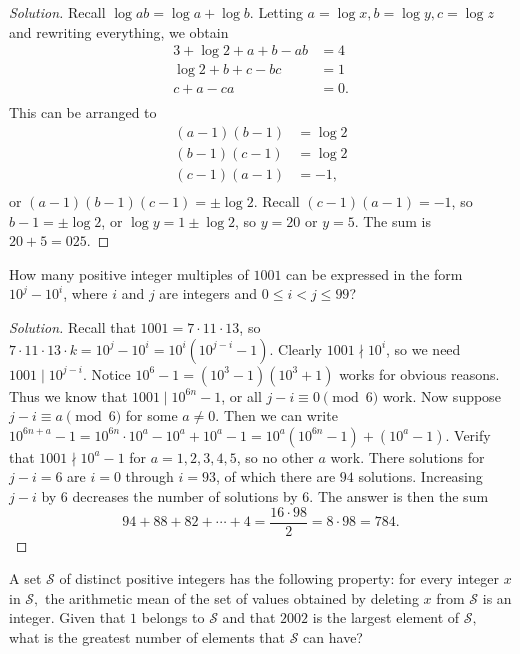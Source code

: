 \ifsolutions
\begin{proof}[Solution]
Recall $\log ab = \log a + \log b$. Letting $a = \log x, b = \log y, c = \log z$
and rewriting everything, we obtain
\[ \begin{aligned}
3 + \log 2 + a + b - ab &= 4 \\
\log 2 + b + c - bc &= 1 \\
c + a - ca &= 0. \\
\end{aligned} \]
This can be arranged to
\[ \begin{aligned}
(a - 1)(b - 1) &= \log 2 \\
(b - 1)(c - 1) &= \log 2 \\
(c - 1)(a - 1) &= -1, \\
\end{aligned} \]
or $(a - 1)(b - 1)(c - 1) = \pm \log 2$. Recall $(c - 1)(a - 1) = -1$, so $b - 1
= \pm \log 2$, or $\log y = 1 \pm \log 2$, so $y = 20$ or $y = 5$. The sum is
$20 + 5 = \boxed{025}$.
\end{proof}
\fi

\begin{prb}[2001 AIME II-10]
How many positive integer multiples of $1001$ can be expressed in the form $10^j
- 10^i$, where $i$ and $j$ are integers and $0 \leq i < j \leq 99$?
\end{prb}

\ifsolutions
\begin{proof}[Solution]
Recall that $1001 = 7 \cdot 11 \cdot 13$, so $7 \cdot 11 \cdot 13 \cdot k = 10^j
- 10^i = 10^i (10^{j - i} - 1)$. Clearly $1001 \nmid 10^i$, so we need $1001
\mid 10^{j - i}$. Notice $10^6 - 1 = (10^3 - 1)(10^3 + 1)$ works for obvious
reasons. Thus we know that $1001 \mid 10^{6n} - 1$, or all $j - i \equiv 0
\pmod{6}$ work. Now suppose $j - i \equiv a \pmod{6}$ for some $a \neq 0$. Then
we can write $10^{6n + a} - 1 = 10^{6n} \cdot 10^a - 10^a + 10^a - 1 = 10^a
(10^{6n} - 1) + (10^a - 1)$. Verify that $1001 \nmid 10^a - 1$ for $a = 1, 2, 3,
4, 5$, so no other $a$ work. There solutions for $j - i = 6$ are $i = 0$ through
$i = 93$, of which there are $94$ solutions. Increasing $j - i$ by $6$ decreases
the number of solutions by $6$. The answer is then the sum
\[ 94 + 88 + 82 + \cdots + 4 = \frac{16 \cdot 98}{2} = 8 \cdot 98 = \boxed{784}.
\]
\end{proof}
\fi

\begin{prb}[2002 AIME I-14]
A set $\mathcal{S}$ of distinct positive integers has the following property:
for every integer $x$ in $\mathcal{S},$ the arithmetic mean of the set of values
obtained by deleting  $x$ from $\mathcal{S}$ is an integer. Given that $1$
belongs to $\mathcal{S}$ and that $2002$ is the largest element of
$\mathcal{S},$ what is the greatest number of elements that $\mathcal{S}$ can
have?
\end{prb}

